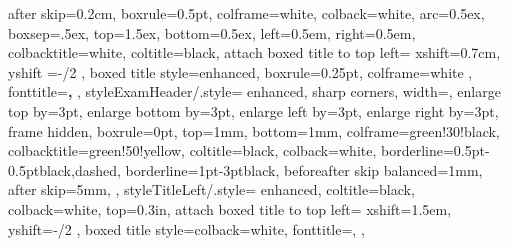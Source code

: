 {{        %
        after skip=0.2cm,
        boxrule=0.5pt,
        colframe=white, 
        colback=white, 
        arc=0.5ex,
        boxsep=.5ex, 
        top=1.5ex, bottom=0.5ex, left=0.5em, right=0.5em,
        colbacktitle=white, 
        coltitle=black,
        attach boxed title to
		top left={
                                        xshift=0.7cm, 
                                        yshift =-\tcboxedtitleheight/2
                                        },
        boxed title style={enhanced, 
                           boxrule=0.25pt, 
                           colframe=white
                        },
        fonttitle=\bfseries,
    },
	styleExamHeader/.style={
        enhanced,
        sharp corners,
        width=\linewidth-6pt,
        enlarge top by=3pt,
        enlarge bottom by=3pt,
        enlarge left by=3pt,
        enlarge right by=3pt,
        frame hidden,
        boxrule=0pt,
        top=1mm,
        bottom=1mm,
        colframe=green!30!black, 
        colbacktitle=green!50!yellow,
        coltitle=black, 
        colback=white,
        borderline={0.5pt}{-0.5pt}{black,dashed},
        borderline={1pt}{-3pt}{black},
        beforeafter skip balanced=1mm,
        after skip=5mm,		
    },
    styleTitleLeft/.style={
	    enhanced, 
	    coltitle=black,
        colback=white,
        top=0.3in,
        attach boxed title to top left={
            xshift=1.5em,
            yshift=-\tcboxedtitleheight/2
        },
        boxed title style={colback=white},
		fonttitle=\huge,
    },
}

